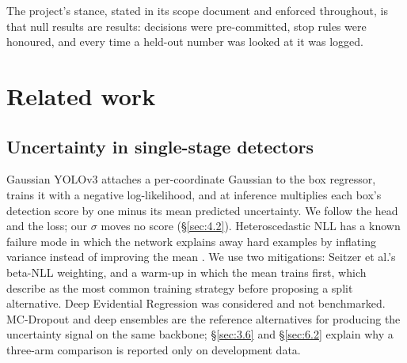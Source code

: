 \documentclass[10pt]{article}
\begin{document}
The project's stance, stated in its scope document and enforced throughout, is that null results are results: decisions were pre-committed, stop rules were honoured, and every time a held-out number was looked at it was logged.

\section{Related work}\label{sec:2}
\subsection{Uncertainty in single-stage detectors}\label{sec:2.1}
Gaussian YOLOv3 \citep{choi2019gaussian} attaches a per-coordinate Gaussian to the box regressor, trains it with a negative log-likelihood, and at inference multiplies each box's detection score by one minus its mean predicted uncertainty. We follow the head and the loss; our $\sigma$ moves no score (\S\ref{sec:4.2}). Heteroscedastic NLL has a known failure mode in which the network explains away hard examples by inflating variance instead of improving the mean \citep{seitzer2022on}. We use two mitigations: Seitzer et al.'s beta-NLL weighting, and a warm-up in which the mean trains first, which \citet{skafte2019reliable} describe as the most common training strategy before proposing a split alternative. Deep Evidential Regression \citep{amini2020deep} was considered and not benchmarked. MC-Dropout \citep{gal2016dropout} and deep ensembles \citep{lakshminarayanan2017simple} are the reference alternatives for producing the uncertainty signal on the same backbone; \S\ref{sec:3.6} and \S\ref{sec:6.2} explain why a three-arm comparison is reported only on development data.
\end{document}
